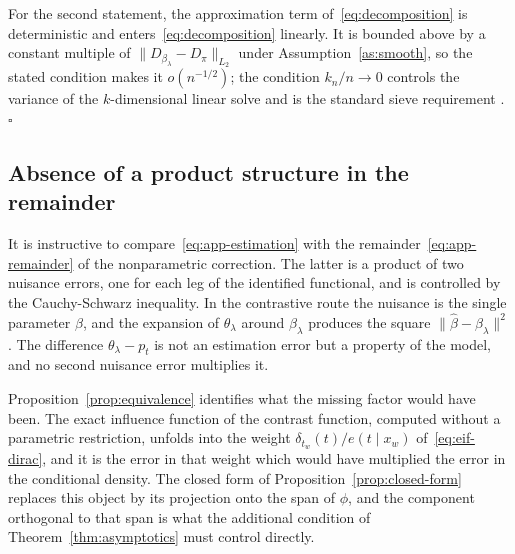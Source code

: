 \documentclass[11pt]{article}
\theoremstyle{plain}
\theoremstyle{definition}
\theoremstyle{remark}
\newcommand{\ratio}{\ensuremath{\pi}}
\newcommand{\contrast}{D_{\ratio}}
\newcommand{\betahat}{\widehat{\beta}}
\newcommand{\ks}{k}
\newcommand{\gps}{e}
\begin{document}
For the second statement, the approximation term of~\eqref{eq:decomposition} is
deterministic and enters~\eqref{eq:decomposition} linearly. It is bounded above by a
constant multiple of $\|D_{\beta_\lambda} - \contrast\|_{L_2}$ under
Assumption~\ref{as:smooth}, so the stated condition makes it $o(n^{-1/2})$; the condition
$\ks_n/n \to 0$ controls the variance of the $\ks$-dimensional linear solve and is the
standard sieve requirement \citep{chen2007,farrell2021}. \hfill$\square$

\subsection{Absence of a product structure in the remainder}
\label{app:asymptotics-dr}

It is instructive to compare~\eqref{eq:app-estimation} with the
remainder~\eqref{eq:app-remainder} of the nonparametric correction. The latter is a
product of two nuisance errors, one for each leg of the identified functional, and is
controlled by the Cauchy-Schwarz inequality. In the contrastive route the nuisance is the
single parameter $\beta$, and the expansion of $\theta_\lambda$ around $\beta_\lambda$
produces the square $\|\betahat - \beta_\lambda\|^2$. The difference
$\theta_\lambda - p_t$ is not an estimation error but a property of the model, and no
second nuisance error multiplies it.

Proposition~\ref{prop:equivalence} identifies what the missing factor would have been.
The exact influence function of the contrast function, computed without a parametric
restriction, unfolds into the weight
$\delta_{t_w}(t)/\gps(t \mid x_w)$ of~\eqref{eq:eif-dirac}, and it is the error in that
weight which would have multiplied the error in the conditional density. The closed form
of Proposition~\ref{prop:closed-form} replaces this object by its projection onto the
span of $\phi$, and the component orthogonal to that span is what the additional
condition of Theorem~\ref{thm:asymptotics} must control directly.
\end{document}
